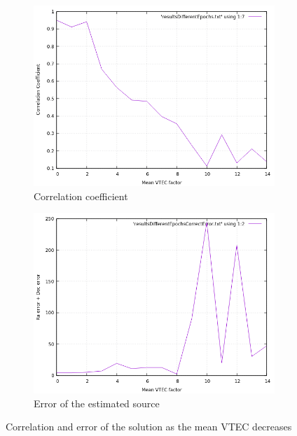 \begin{figure}[!htb]
	\begin{subfigure}[b]{0.5\textwidth}
		\includegraphics[width=\linewidth]{images/ch6/spikes/correlationDecrease.png}
		\caption{Correlation coefficient}
	\end{subfigure}
	\hfill
	\begin{subfigure}[b]{0.5\textwidth}
		\includegraphics[width=\linewidth]{images/ch6/spikes/decreaseRangeError.png}
		\caption{Error of the estimated source}
	\end{subfigure}
	\caption{Correlation and error of the solution as the mean VTEC decreases}
	\label{fig:differentEpochs}
\end{figure}

